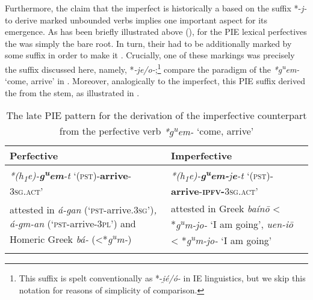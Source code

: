 \documentclass[output=paper]{langsci/langscibook}
\begin{document}
Furthermore, the claim that the  imperfect is historically a  based on the suffix *-\textit{j-} to derive marked unbounded verbs implies one important aspect for its emergence. As has been briefly illustrated above (), for the PIE lexical perfectives the  was simply the bare root. In turn, their  had to be additionally marked by some suffix in order to make it . Crucially, one of these markings was precisely the suffix discussed here, namely, *\textit{-je/o-};\footnote{This suffix is spelt conventionally as *-\textit{{i}̯é/ó-} in IE linguistics, but we skip this notation for reasons of simplicity of comparison.} compare the paradigm of the  \textit{*g\textsuperscript{u}em-} ‘come, arrive’ in  \citep[315]{Seržant2008}. Moreover, analogically to the  imperfect, this PIE suffix derived the  from the  stem, as illustrated in .


\begin{table}
\caption{The late PIE pattern for the derivation of the imperfective counterpart from the perfective verb \textit{*g\textsuperscript{u}em-} ‘come, arrive’}
\label{tab:wiemer:9}
\begin{tabularx}{\textwidth}{QQ}
\lsptoprule
 {{Perfective}}  & {{Imperfective}}\\
\midrule 
 \textit{*(h\textsubscript{1}e)-\textbf{g{\textsuperscript{u}}em}-t} \newline 
 ‘(\textsc{pst)}-\textbf{arrive}-\textsc{3sg.act}’ & 
\textit{*(h\textsubscript{1}e)-\textbf{g\textsuperscript{u}em-}j\textbf{e}-t} \newline
 ‘(\textsc{pst)}-\textbf{arrive}-\textbf{\textsc{ipfv-}}\textsc{3sg.act}’\\
\footnotesize
attested in 
\newline
{}   \textit{á-gan} (‘\textsc{pst}-arrive.\textsc{3sg’})\textit{, á-gm-an} (‘\textsc{pst}-arrive-\textsc{3pl’}) and 
\newline
Homeric Greek  \textit{bá-} (<*\textit{g\textsuperscript{u}m-}) & 
\footnotesize
attested in \newline
Greek \textit{baín}\textit{\=o} < *\textit{g\textsuperscript{u}m-jo-} ‘I am going’, 
\newline
{} \textit{uen-i\=o} < *\textit{g\textsuperscript{u}m-jo-}  ‘I am going’\\
\lspbottomrule
\end{tabularx}
\end{table}
\end{document}
